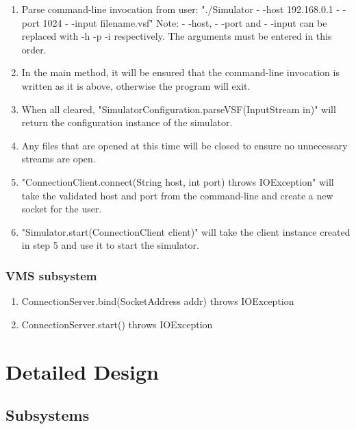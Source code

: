 \documentclass{article}
\begin{document}
\begin{enumerate}
  \item Parse command-line invocation from user: 
		\newline "./Simulator - -host 192.168.0.1 - -port 1024 - -input filename.vsf"
		\newline Note: - -host, - -port and - -input can be replaced with -h -p -i respectively.
		\newline The arguments must be entered in this order.
  \item In the main method, it will be ensured that the command-line invocation is written as it is above, otherwise the program will exit.
  \item When all cleared, "SimulatorConfiguration.parseVSF(InputStream in)" will return the configuration instance of the simulator.
  \item Any files that are opened at this time will be closed to ensure no unnecessary streams are open.
	\item "ConnectionClient.connect(String host, int port) throws IOException" will take the validated host and port from the command-line and create a new socket for the user.
	\item "Simulator.start(ConnectionClient client)" will take the client instance created in step 5 and use it to start the simulator.	
\end{enumerate}

\subsubsection{VMS subsystem} %

\begin{enumerate}
  \item ConnectionServer.bind(SocketAddress addr) throws IOException
	\item ConnectionServer.start() throws IOException
\end{enumerate}

\break

\section{Detailed Design} %

\subsection{Subsystems} %
\end{document}
